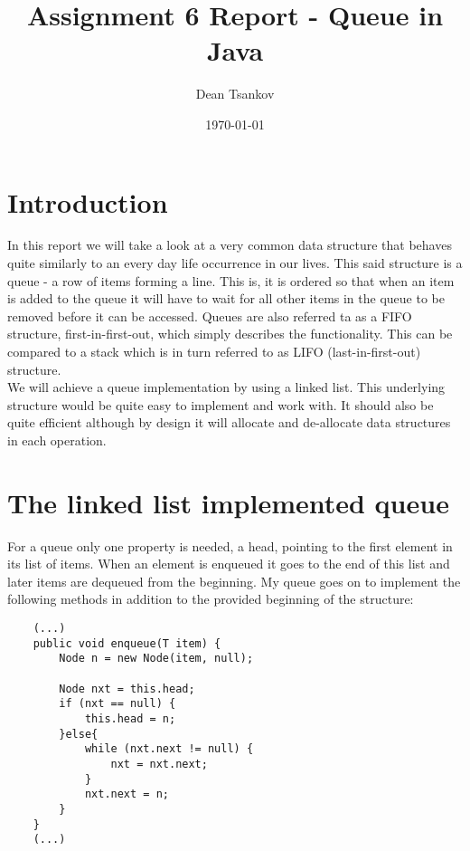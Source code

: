 \documentclass[a4paper,11pt]{article}
\begin{document}
\title{
    \textbf{Assignment 6 Report - Queue in Java}
}
\author{Dean Tsankov}
\date{\today}

\maketitle

\section*{Introduction}

In this report we will take a look at a very common data structure that behaves quite similarly to an every day life occurrence in our lives. This said structure is a queue - a row of items forming a line. This is, it is ordered so that when an item is added to the queue it will have to wait for all other items in the queue to be removed before it can be accessed. Queues are also referred ta as a FIFO structure, first-in-first-out, which simply describes the functionality. This can be compared to a stack which is in turn referred to as LIFO (last-in-first-out) structure. 
\\

We will achieve a queue implementation by using a linked list. This underlying structure would be quite easy to implement and work with. It should also be quite efficient although by design it will allocate and de-allocate data structures in each operation.

\section*{The linked list implemented queue}

For a queue only one property is needed, a head, pointing to the first element in its list of items. When an element is enqueued it goes to the end of this list and later items are dequeued from the beginning. My queue goes on to implement the following methods in addition to the provided beginning of the structure:

\begin{verbatim}
    (...)
    public void enqueue(T item) {
        Node n = new Node(item, null);

        Node nxt = this.head;
        if (nxt == null) {
            this.head = n;
        }else{
            while (nxt.next != null) {
                nxt = nxt.next;
            }
            nxt.next = n;
        }
    }
    (...)
\end{verbatim}
\end{document}

